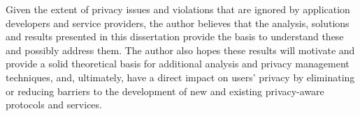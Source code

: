 Given the extent of privacy issues and violations that are ignored by application developers and service providers, the author believes that the analysis, solutions and results presented in this dissertation provide the basis to understand these and possibly address them.
The author also hopes these results will motivate and provide a solid theoretical basis for additional analysis and privacy management techniques, and, ultimately, have a direct impact on users' privacy by eliminating or reducing barriers to the development of new and existing privacy-aware protocols and services.